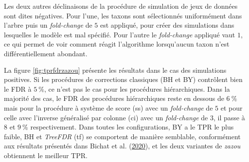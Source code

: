 \documentclass[12pt,a4paper]{reedthesis}
\theoremstyle{definition}
\theoremstyle{definition}
\theoremstyle{definition}
\theoremstyle{remark}
\begin{document}
Les deux autres déclinaisons de la procédure de simulation de jeux de données sont dites négatives. Pour l'une, les taxons sont sélectionnés uniformément dans l'arbre puis un \emph{fold-change} de \(5\) est appliqué, pour créer des simulations dans lesquelles le modèle est mal spécifié. Pour l'autre le \emph{fold-change} appliqué vaut \(1\), ce qui permet de voir comment réagit l'algorithme lorsqu'aucun taxon n'est différentiellement abondant.

La figure \ref{fig:tprfdrzazou} présente les résultats dans le cas des simulations positives. Si les procédures de corrections classiques (BH et BY) contrôlent bien le FDR à \(5~\%\), ce n'est pas le cas pour les procédures hiérarchiques. Dans la majorité des cas, le FDR des procédures hiérarchiques reste en dessous de \(6~\%\) mais pour la procédure à système de score (ss) avec un \emph{fold-change} de \(5\) et pour celle avec l'inverse généralisé par colonne (ci) avec un \emph{fold-change} de \(3\), il passe à \(8\) et \(9~\%\) respectivement. Dans toutes les configurations, BY a le TPR le plus faible, BH et \emph{TreeFDR} (tf) se comportent de manière semblable, conformément aux résultats présentés dans Bichat et al. (\protect\hyperlink{ref-bichat2020incorporating}{2020}), et les deux variantes de \emph{zazou} obtiennent le meilleur TPR.
\end{document}

